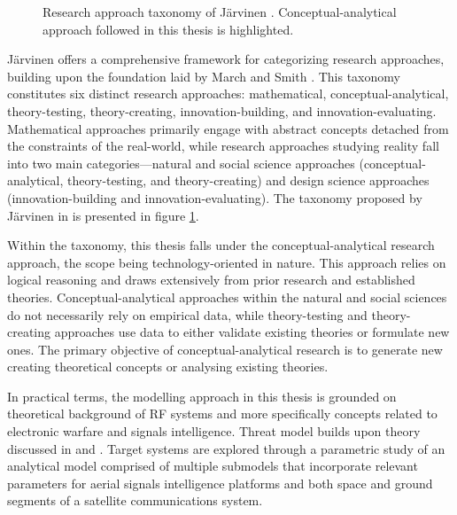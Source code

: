 \documentclass[english, 12pt, a4paper, elec, utf8, a-1b, online]{aaltothesis}
\begin{document}
\begin{figure}[h]
  \centering
  
  \caption{Research approach taxonomy of Järvinen \cite{jarvinen2011tutkimustyon, jarvinen2004research}. Conceptual-analytical approach followed in this thesis is highlighted.}
  \label{fig-research-taxonomy}
\end{figure}

Järvinen \cite{jarvinen2011tutkimustyon, jarvinen2004research} offers a comprehensive framework for categorizing research approaches, building upon the foundation laid by March and Smith \cite{march1995design}.
This taxonomy constitutes six distinct research approaches: mathematical, conceptual-analytical, theory-testing, theory-creating, innovation-building, and innovation-evaluating.
Mathematical approaches primarily engage with abstract concepts detached from the constraints of the real-world, while research approaches studying reality fall into two main categories—natural and social science approaches (conceptual-analytical, theory-testing, and theory-creating) and design science approaches (innovation-building and innovation-evaluating).
The taxonomy proposed by Järvinen in \cite{jarvinen2011tutkimustyon, jarvinen2004research} is presented in figure \ref{fig-research-taxonomy}.

Within the taxonomy, this thesis falls under the conceptual-analytical research approach, the scope being technology-oriented in nature. This approach relies on logical reasoning and draws extensively from prior research and established theories. Conceptual-analytical approaches within the natural and social sciences do not necessarily rely on empirical data, while theory-testing and theory-creating approaches use data to either validate existing theories or formulate new ones. The primary objective of conceptual-analytical research is to generate new creating theoretical concepts or analysing existing theories.

In practical terms, the modelling approach in this thesis is grounded on theoretical background of RF systems and more specifically concepts related to electronic warfare and signals intelligence.
Threat model builds upon theory discussed in \cite{kosola2013digitaalinen} and \cite{wiley2006elint}.
Target systems are explored through a parametric study of an analytical model comprised of multiple submodels that incorporate relevant parameters for aerial signals intelligence platforms and both space and ground segments of a satellite communications system.
\end{document}
